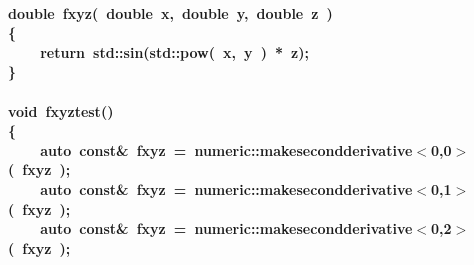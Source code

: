 \documentclass[9pt,onside,a4paper]{article}
\newcommand{\hlstd}[1]{\textcolor[rgb]{0.2,0,0.4}{#1}}
\newcommand{\hlnum}[1]{\textcolor[rgb]{0.2,0.73,0.02}{#1}}
\newcommand{\hlopt}[1]{\textcolor[rgb]{0.33,0.33,0.33}{#1}}
\newcommand{\hlkwa}[1]{\textcolor[rgb]{1,0.19,0.19}{#1}}
\newcommand{\hlkwb}[1]{\textcolor[rgb]{0.96,0.55,0.14}{#1}}
\newcommand{\hlkwc}[1]{\textcolor[rgb]{0,0,1}{#1}}
\newcommand{\hlkwd}[1]{\textcolor[rgb]{0.82,0.11,0.93}{#1}}
\begin{document}
\paragraph{
\hlkwb{double\ }\hlstd{}\hlkwd{fxyz}\hlstd{}\hlopt{(\ }\hlstd{}\hlkwb{double\ }\hlstd{x}\hlopt{,\ }\hlstd{}\hlkwb{double\ }\hlstd{y}\hlopt{,\ }\hlstd{}\hlkwb{double\ }\hlstd{z\ }\hlopt{)}\hspace*{\fill}\\
\hlstd{}\hlopt{\{}\hspace*{\fill}\\
\hlstd{}\hlstd{\ \ \ \ }\hlstd{}\hlkwa{return\ }\hlstd{std}\hlopt{::}\hlstd{}\hlkwd{sin}\hlstd{}\hlopt{(}\hlstd{std}\hlopt{::}\hlstd{}\hlkwd{pow}\hlstd{}\hlopt{(\ }\hlstd{x}\hlopt{,\ }\hlstd{y\ }\hlopt{)\ {*}\ }\hlstd{z}\hlopt{);}\hspace*{\fill}\\
\hlstd{}\hlopt{\}}\hspace*{\fill}\\
\hlstd{}\hspace*{\fill}\\
\hlkwb{void\ }\hlstd{}\hlkwd{fxyz\textunderscore test}\hlstd{}\hlopt{()}\hspace*{\fill}\\
\hlstd{}\hlopt{\{}\hspace*{\fill}\\
\hlstd{}\hlstd{\ \ \ \ }\hlstd{}\hlkwc{auto\ }\hlstd{}\hlkwb{const}\hlstd{}\hlopt{\&\ }\hlstd{fxyz\ }\hlopt{=\ }\hlstd{numeric}\hlopt{::}\hlstd{make\textunderscore second\textunderscore derivative}\hlopt{$<$}\hlstd{}\hlnum{0}\hlstd{}\hlopt{,}\hlstd{}\hlnum{0}\hlstd{}\hlopt{$>$(\ }\hlstd{fxyz\ }\hlopt{);}\hspace*{\fill}\\
\hlstd{}\hlstd{\ \ \ \ }\hlstd{}\hlkwc{auto\ }\hlstd{}\hlkwb{const}\hlstd{}\hlopt{\&\ }\hlstd{fxyz\ }\hlopt{=\ }\hlstd{numeric}\hlopt{::}\hlstd{make\textunderscore second\textunderscore derivative}\hlopt{$<$}\hlstd{}\hlnum{0}\hlstd{}\hlopt{,}\hlstd{}\hlnum{1}\hlstd{}\hlopt{$>$(\ }\hlstd{fxyz\ }\hlopt{);}\hspace*{\fill}\\
\hlstd{}\hlstd{\ \ \ \ }\hlstd{}\hlkwc{auto\ }\hlstd{}\hlkwb{const}\hlstd{}\hlopt{\&\ }\hlstd{fxyz\ }\hlopt{=\ }\hlstd{numeric}\hlopt{::}\hlstd{make\textunderscore second\textunderscore derivative}\hlopt{$<$}\hlstd{}\hlnum{0}\hlstd{}\hlopt{,}\hlstd{}\hlnum{2}\hlstd{}\hlopt{$>$(\ }\hlstd{fxyz\ }\hlopt{);}\hspace*{\fill}\\
}
\end{document}
